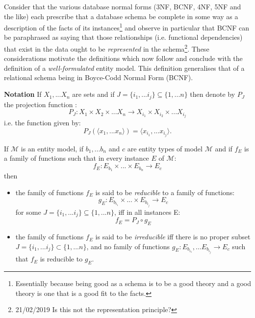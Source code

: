 \documentclass[10pt,a4paper]{article}
\newcommand{\term}[1]{\textit{{#1}}}
\newcommand{\genericmodel}{\mathcal{M}}
\begin{document}
\noindent
Consider that the various database normal forms (3NF, BCNF, 4NF, 5NF and the like) each 
prescribe that a database schema be complete in some way as a description of the facts of its instances\footnote{Essentially
 because being good as a schema is to be a good theory and a good theory is one that is a good fit to the facts.} and observe 
in particular that BCNF can be paraphrased as saying that those relationships (i.e. functional dependencies) that exist in the data ought to be \term{represented} in the schema\footnote{21/02/2019 Is this not the representation principle?}. These considerations motivate the definitions which now follow and conclude with the definition of a \term{well-formulated} entity model. This definition generalises that of a relational schema being in Boyce-Codd Normal Form (BCNF). 
   
\noindent \textbf{Notation}
If $X_1,...X_n$ are sets and if $J=\{i_1,...i_j\} \subseteq \{1,...n\}$ then denote by $P_J$ the projection function :
$$
P_J : X_1 \times X_2 \times ...X_n \rightarrow X_{i_1} \times X_{i_2} \times ... X_{i_j}
$$
\noindent i.e. the function given by:
$$
P_J(\langle x_1,...x_n \rangle ) = \langle x_{i_1},...x_{i_j} \rangle.
$$

\begin{definition}
If $\genericmodel$ is an entity model, if $b_1,...b_n$ and $c$ are entity types of model $\genericmodel$  and if $f_E$ is a family of functions 
such that in every instance $E$ of $\genericmodel$:
$$
f_E : E_{b_1} \times ... \times E_{b_n} \rightarrow E_c
$$
then 
\begin {itemize}
\item{the family of functions $f_E$ is said to be \term{reducible} to a family of functions:
$$
g_E : E_{b_{i_1}} \times ... \times E_{b_{i_j}} \rightarrow E_c
$$
for some $J=\{i_1,...i_j\} \subseteq \{1,...n\}$, iff in all instances E:
$$
f_E = P_J \circ g_E
$$
}
\item{
the family of functions $f_E$ is said to be \term{irreducible} iff there is no proper subset
 $J=\{i_1,...i_j\} \subset \{1,...n\}$, and no family of functions 
$g_E : E_{b_{i_1}},...E_{b_{i_j}} \rightarrow E_c$ such that $f_E$ is reducible to $g_E$.
}
\end{itemize}
\end{definition}
\end{document}
